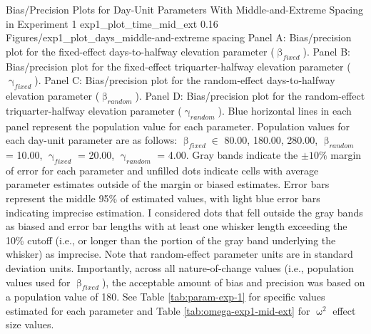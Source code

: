 \documentclass[
12pt, %
twoside,
english]{guelphthesis}
\begin{document}
\begin{apaFigure}
[portrait]
[samepage]
[-0.2cm]
{Bias/Precision Plots for Day-Unit Parameters With Middle-and-Extreme Spacing in Experiment 1}
{exp1_plot_time_mid_ext}
{0.16}
{Figures/exp1_plot_days_middle-and-extreme spacing}
{Panel A: Bias/precision plot for the fixed-effect days-to-halfway elevation parameter ($\upbeta_{fixed}$). Panel B: Bias/precision plot for the fixed-effect triquarter-halfway elevation parameter ($\upgamma_{fixed}$). Panel C: Bias/precision plot for the random-effect days-to-halfway elevation parameter ($\upbeta_{random}$). Panel D: Bias/precision plot for the random-effect triquarter-halfway elevation parameter ($\upgamma_{random}$). Blue horizontal lines in each panel represent the population value for each parameter. Population values for each day-unit parameter are as follows: $\upbeta_{fixed} \in$ {80.00, 180.00, 280.00}, $\upbeta_{random}$ = 10.00, $\upgamma_{fixed}$ = 20.00, $\upgamma_{random}$ = 4.00. Gray bands indicate the $\pm 10\%$ margin of error for each parameter and unfilled dots indicate cells with average parameter estimates outside of the margin or biased estimates. Error bars represent the middle 95\% of estimated values, with light blue error bars indicating imprecise estimation. I considered dots that fell outside the gray bands as biased and error bar lengths with at least one whisker length exceeding the 10\% cutoff (i.e., or longer than the portion of the gray band underlying the whisker) as imprecise. Note that random-effect parameter units are in standard deviation units. Importantly, across all nature-of-change values (i.e., population values used for $\upbeta_{fixed}$), the acceptable amount of bias and precision was based on a population value of 180. See Table \ref{tab:param-exp-1} for specific values estimated for each parameter and Table \ref{tab:omega-exp1-mid-ext} for $\upomega^2$ effect size values.}
\end{apaFigure}
\end{document}
